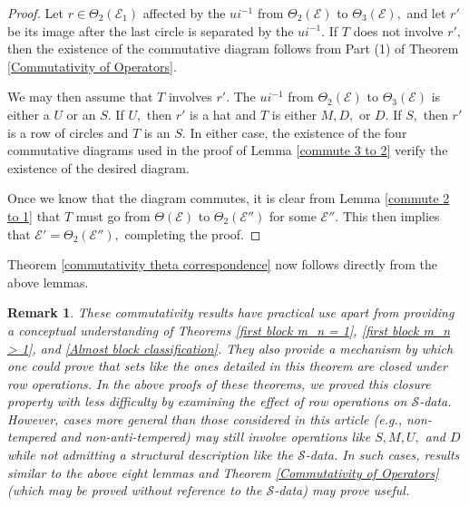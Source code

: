 \documentclass[11pt,letterpaper]{amsart}
\newcommand{\EE}{\mathcal{E}}
\newtheorem{rmk}[thm]{Remark}
\numberwithin{equation}{section}
\begin{document}
\begin{proof}
    Let $r \in \Theta_2(\EE_1)$ affected by the $ui^{-1}$ from $\Theta_2(\EE)$ to $\Theta_3(\EE),$ and let $r'$ be its image after the last circle is separated by the $ui^{-1}.$ If $T$ does not involve $r',$ then the existence of the commutative diagram follows from Part (1) of Theorem \ref{Commutativity of Operators}.

    We may then assume that $T$ involves $r'$. The $ui^{-1}$ from $\Theta_2(\EE)$ to $\Theta_3(\EE)$ is either a $U$ or an $S.$ If $U,$ then $r'$ is a hat and $T$ is either $M, D,$ or $D.$ If $S,$ then $r'$ is a row of circles and $T$ is an $S.$ In either case, the existence of the four commutative diagrams used in the proof of Lemma \ref{commute 3 to 2} verify the existence of the desired diagram.

    Once we know that the diagram commutes, it is clear from Lemma \ref{commute 2 to 1} that $T$ must go from $\Theta(\EE)$ to $\Theta_2(\EE'')$ for some $\EE''.$ This then implies that $\EE' = \Theta_2(\EE''),$ completing the proof.
\end{proof}

Theorem \ref{commutativity theta correspondence} now follows directly from the above lemmas.

\begin{rmk}
    These commutativity results have practical use apart from providing a conceptual understanding of Theorems \ref{first block m_n = 1}, \ref{first block m_n > 1}, and \ref{Almost block classification}. They also provide a mechanism by which one could prove that sets like the ones detailed in this theorem are closed under row operations. In the above proofs of these theorems, we proved this closure property with less difficulty by examining the effect of row operations on $\mathcal{S}$-data. However, cases more general than those considered in this article (e.g., non-tempered and non-anti-tempered) may still involve operations like $S, M, U,$ and $D$ while not admitting a structural description like the $\mathcal{S}$-data. In such cases, results similar to the above eight lemmas and Theorem \ref{Commutativity of Operators} (which may be proved without reference to the $\mathcal{S}$-data) may prove useful.
\end{rmk}



\end{document}
